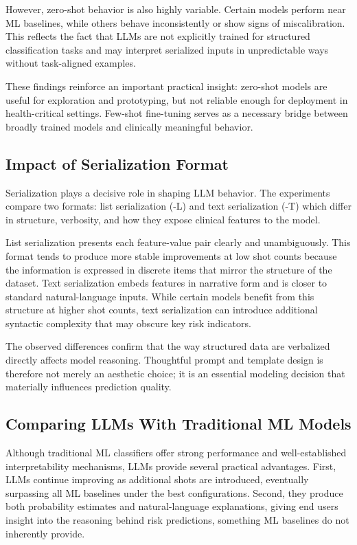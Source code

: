 However, zero-shot behavior is also highly variable. Certain models perform near ML baselines, while others behave inconsistently or show signs of miscalibration. This reflects the fact that LLMs are not explicitly trained for structured classification tasks and may interpret serialized inputs in unpredictable ways without task-aligned examples.

These findings reinforce an important practical insight: zero-shot models are useful for exploration and prototyping, but not reliable enough for deployment in health-critical settings. Few-shot fine-tuning serves as a necessary bridge between broadly trained models and clinically meaningful behavior.

\subsection{Impact of Serialization Format}
Serialization plays a decisive role in shaping LLM behavior. The experiments compare two formats: list serialization (-L) and text serialization (-T) which differ in structure, verbosity, and how they expose clinical features to the model.

List serialization presents each feature-value pair clearly and unambiguously. This format tends to produce more stable improvements at low shot counts because the information is expressed in discrete items that mirror the structure of the dataset. Text serialization embeds features in narrative form and is closer to standard natural-language inputs. While certain models benefit from this structure at higher shot counts, text serialization can introduce additional syntactic complexity that may obscure key risk indicators.

The observed differences confirm that the way structured data are verbalized directly affects model reasoning. Thoughtful prompt and template design is therefore not merely an aesthetic choice; it is an essential modeling decision that materially influences prediction quality.

\subsection{Comparing LLMs With Traditional ML Models}
Although traditional ML classifiers offer strong performance and well-established interpretability mechanisms, LLMs provide several practical advantages. First, LLMs continue improving as additional shots are introduced, eventually surpassing all ML baselines under the best configurations. Second, they produce both probability estimates and natural-language explanations, giving end users insight into the reasoning behind risk predictions, something ML baselines do not inherently provide.

